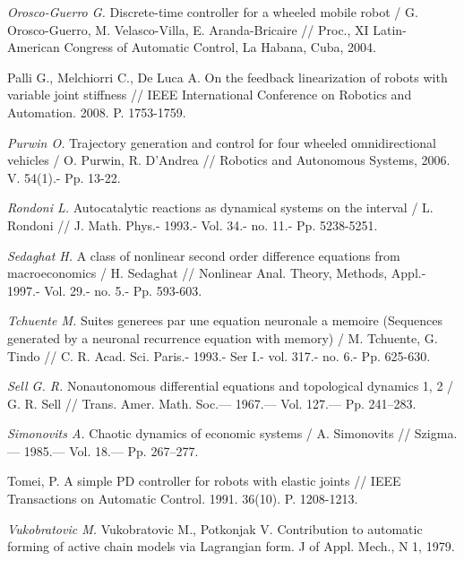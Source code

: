 \begin{thebibliography}{10}
	{\it Orosco-Guerro G.} Discrete-time controller for a wheeled mobile robot / G. Orosco-Guerro, M. Velasco-Villa, E. Aranda-Bricaire // Proc., XI Latin-American Congress of Automatic Control, La Habana, Cuba, 2004.
	
	
	Palli G., Melchiorri C., De Luca A. On the feedback linearization of robots with variable joint
	stiffness // IEEE International Conference on Robotics and Automation. 2008. P. 1753-1759.
	
	{\it Purwin O.} Trajectory generation and control for four wheeled omnidirectional vehicles / O. Purwin, R. D'Andrea // Robotics and Autonomous Systems, 2006. V. 54(1).- Pp. 13-22.
	
	{\it Rondoni L.} Autocatalytic reactions as dynamical systems on the interval / L. Rondoni // J. Math. Phys.- 1993.- Vol. 34.- no. 11.- Pp. 5238-5251.
	
	{\it Sedaghat H.} A class of nonlinear second order difference equations from macroeconomics / H. Sedaghat // Nonlinear Anal. Theory, Methods, Appl.- 1997.- Vol. 29.- no. 5.- Pp. 593-603.
	
	{\it Tchuente M.} Suites generees par une equation neuronale a memoire (Sequences generated by a neuronal recurrence equation with memory) / M. Tchuente, G. Tindo // C. R. Acad. Sci. Paris.- 1993.- Ser I.- vol. 317.- no. 6.- Pp. 625-630.
	
	{\it Sell G. R.} Nonautonomous differential equations and topological dynamics 1, 2 /
	G. R. Sell // Trans. Amer. Math. Soc.— 1967.— Vol. 127.— Pp. 241–283.
	
	{\it Simonovits A.} Chaotic dynamics of economic systems /
	A. Simonovits // Szigma.— 1985.— Vol. 18.— Pp. 267–277.
	
	 Tomei, P. A simple PD controller for robots with elastic joints // IEEE Transactions on
	Automatic Control. 1991. 36(10). P. 1208-1213.
	
	{\it Vukobratovic M.} Vukobratovic M., Potkonjak V. Contribution to automatic forming of active chain models via Lagrangian form. J of Appl. Mech., N 1, 1979.
	

\end{thebibliography}
